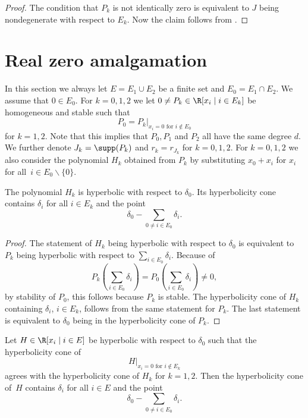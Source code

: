 \begin{proof}
    The condition that $P_k$ is not identically zero is equivalent to $J$ being nondegenerate with respect to $E_k$. Now the claim follows from .
\end{proof}

\section{Real zero amalgamation}\label{sec:amal}
In this section we always let $E=E_1\cup E_2$ be a finite set and $E_0=E_1\cap E_2$. We assume that $0\in E_0$. For $k=0,1,2$ we let $0\neq P_k\in\R[x_i\mid i\in E_k]$ be homogeneous and stable such that
\begin{equation*}
    P_0=P_k|_{x_i=0\textrm{ for }i\not\in E_0}
\end{equation*}
for $k=1,2$. Note that this implies that $P_0,P_1$ and $P_2$ all have the same degree $d$. We further denote $J_k=\supp(P_k)$ and $r_k=r_{J_k}$ for $k=0,1,2$. For $k=0,1,2$ we also consider the polynomial $H_k$ obtained from $P_k$ by substituting $x_0+x_i$ for $x_i$ for all~$i\in E_0\smallsetminus\{0\}$.

\begin{lem}\label{lem:hypcone1}
    The polynomial $H_k$ is hyperbolic with respect to $\delta_0$. Its hyperbolicity cone contains $\delta_i$ for all $i\in E_k$ and the point
    \begin{equation*}
        \delta_0-\sum_{0\neq i\in E_0}\delta_i.
    \end{equation*}
\end{lem}

\begin{proof}
    The statement of $H_k$ being hyperbolic with respect to $\delta_0$ is equivalent to $P_k$ being hyperbolic with respect to $\sum_{i\in E_0}\delta_i$. Because of
    \begin{equation*}
        P_k\left(\sum_{i\in E_0}\delta_i\right)=P_0\left(\sum_{i\in E_0}\delta_i\right)\neq0,
    \end{equation*}
    by stability of $P_0$, this follows because $P_k$ is stable. The hyperbolicity cone of $H_k$ containing $\delta_i$, $i\in E_k$, follows from the same statement for $P_k$. The last statement is equivalent to $\delta_0$ being in the hyperbolicity cone of $P_k$.
\end{proof}

\begin{lem}\label{lem:hypcone2}
    Let $H\in\R[x_i\mid i\in E]$ be hyperbolic with respect to $\delta_0$ such that the hyperbolicity cone of
    \begin{equation*}
     H|_{x_i=0\textrm{ for }i\not\in E_k}
    \end{equation*}
    agrees with the hyperbolicity cone of $H_k$ for $k=1,2$. Then the hyperbolicity cone of~$H$ contains $\delta_i$ for all $i\in E$ and the point
    \begin{equation*}
        \delta_0-\sum_{0\neq i\in E_0}\delta_i.
    \end{equation*}
\end{lem}

